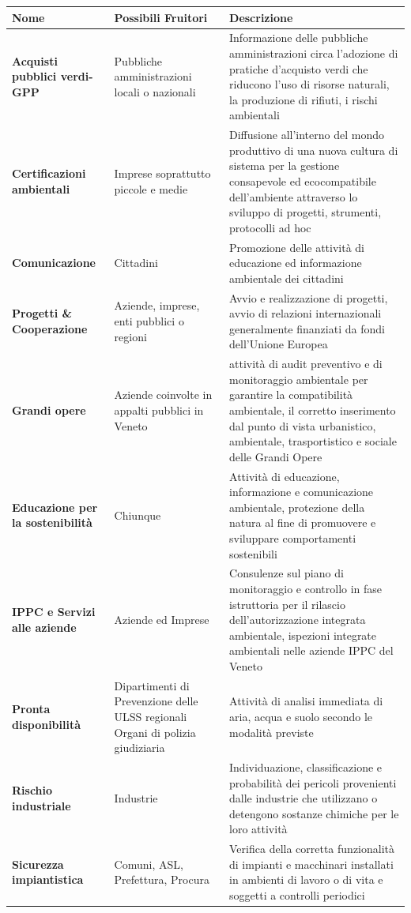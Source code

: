 \begin{longtable}{ p{} | p{} | p{}}
\textbf{Nome}& \textbf{Possibili Fruitori}&  \textbf{Descrizione} \\
\endhead

	\midrule
	\textbf{{\color{OliveGreen}Acquisti pubblici verdi-GPP\ped{g}}} & Pubbliche amministrazioni locali o nazionali  & Informazione delle pubbliche amministrazioni circa l'adozione di pratiche d'acquisto verdi che riducono l'uso di risorse naturali, la produzione di rifiuti, i rischi ambientali \\
	\midrule
	\textbf{{\color{OliveGreen}Certificazioni ambientali}} & Imprese soprattutto piccole e medie &  Diffusione all'interno del mondo produttivo di una nuova cultura di sistema per la gestione consapevole ed ecocompatibile dell'ambiente attraverso lo sviluppo di progetti, strumenti, protocolli ad hoc\\
	\midrule
	\textbf{{\color{OliveGreen}Comunicazione}} & Cittadini & Promozione delle attività di educazione ed informazione ambientale dei cittadini \\
	\midrule
	\textbf{{\color{OliveGreen}Progetti \& Cooperazione}} & Aziende, imprese, enti pubblici o regioni & Avvio e realizzazione di progetti, avvio di relazioni internazionali generalmente finanziati da fondi dell'Unione Europea \\
	\midrule
	\textbf{{\color{OliveGreen} Grandi opere}} & Aziende coinvolte in appalti pubblici in Veneto & attività di audit preventivo e di monitoraggio ambientale per garantire la compatibilità ambientale, il corretto inserimento dal punto di vista urbanistico, ambientale, trasportistico e sociale delle Grandi Opere \\
	\midrule
	\textbf{{\color{OliveGreen} Educazione per la sostenibilità}} & Chiunque &  Attività di educazione, informazione e comunicazione ambientale, protezione della natura al fine di promuovere e sviluppare comportamenti sostenibili \\
	\midrule
	\textbf{{\color{OliveGreen} IPPC\ped{g} e  Servizi alle aziende}} & Aziende ed Imprese & Consulenze sul piano di monitoraggio e controllo in fase istruttoria per il rilascio dell'autorizzazione integrata ambientale, ispezioni integrate ambientali nelle aziende IPPC del Veneto\\
	\midrule
	\textbf{{\color{OliveGreen} Pronta disponibilità}} &  Dipartimenti di Prevenzione delle ULSS regionali Organi di polizia giudiziaria &  Attività di analisi immediata di aria, acqua e suolo secondo le modalità previste\\
	\midrule
	\textbf{{\color{OliveGreen} Rischio industriale}} & Industrie & Individuazione, classificazione e probabilità dei pericoli provenienti dalle industrie che utilizzano o detengono sostanze chimiche per le loro attività \\
	\midrule
	\textbf{{\color{OliveGreen} Sicurezza impiantistica}} & Comuni, ASL, Prefettura, Procura & Verifica della corretta funzionalità di impianti e macchinari installati in ambienti di lavoro o di vita e soggetti a controlli periodici \\
	\bottomrule
	


\end{longtable}
